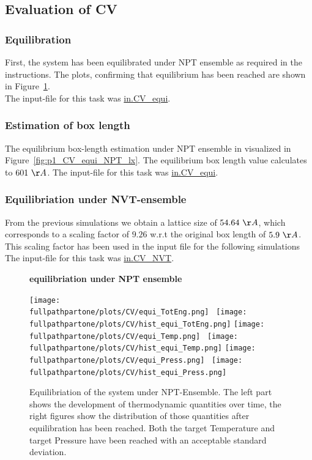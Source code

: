 \documentclass[10pt,a4paper]{report}
\def \pathpartone {../../1_three-dimensional_atomic_system}
\def \fullpathpartone {/home/lukas/Desktop/project/independence/atomistic_modeling/exam/1_three-dimensional_atomic_system}
\newcommand*{\figuretitle}[1]{%
    {\centering%
    \textbf{#1}%
    \par\medskip}%
}
\begin{document}
\subsection{Evaluation of CV}

\subsubsection{Equilibration}
First, the system has been equilibrated under NPT ensemble as required in the instructions. The plots, confirming that equilibrium has been reached are shown in Figure~\ref{fig:p1_CV_equi_NPT}.\\
The input-file for this task was \href{\pathpartone/in.CV_equi}{in.CV\_equi}.


\subsubsection{Estimation of box length}
The equilibrium box-length estimation under NPT ensemble in visualized in Figure~\ref{fig:p1_CV_equi_NPT_lx}. The equilibrium box length value calculates to $601~\AA$.
The input-file for this task was \href{\pathpartone/in.CV_equi}{in.CV\_equi}.

\subsubsection{Equilibriation under NVT-ensemble}
From the previous simulations we obtain a lattice size of $54.64~\AA$, which corresponds to a scaling factor of $9.26$ w.r.t the original box length of $5.9~\AA$.\\
This scaling factor has been used in the input file for the following simulations The input-file for this task was \href{\pathpartone/in.CV_NVT}{in.CV\_NVT}.

\begin{center}
\begin{figure}[h]
\figuretitle{equilibriation under NPT ensemble}
\texttt{[image: \\fullpathpartone/plots/CV/equi\_TotEng.png]}~
\texttt{[image: \\fullpathpartone/plots/CV/hist\_equi\_TotEng.png]}
\texttt{[image: \\fullpathpartone/plots/CV/equi\_Temp.png]}~
\texttt{[image: \\fullpathpartone/plots/CV/hist\_equi\_Temp.png]}
\texttt{[image: \\fullpathpartone/plots/CV/equi\_Press.png]}~
\texttt{[image: \\fullpathpartone/plots/CV/hist\_equi\_Press.png]}
\caption[Equilibriation under NPT ensemble]{Equilibriation of the system under NPT-Ensemble. The left part shows the development of thermodynamic quantities over time, the right figures show the distribution of those quantities after equilibration has been reached. Both the target Temperature and target Pressure have been reached with an acceptable standard deviation.}
\label{fig:p1_CV_equi_NPT}
\end{figure}
\end{center}
\end{document}
